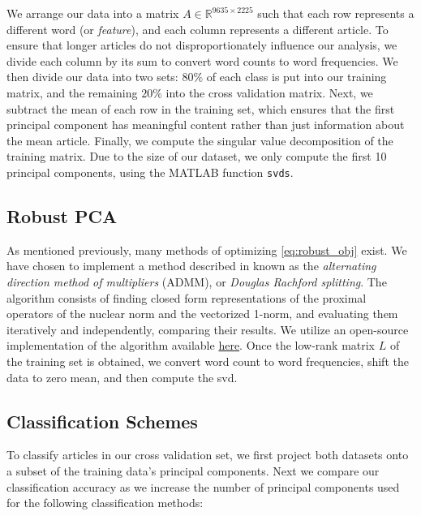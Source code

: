 \documentclass[12pt]{article}
\newcommand{\R}{\mathbb{R}}
\begin{document}
\noindent We arrange our data into a matrix $A \in \R^{9635 \times 2225}$ such that each row represents a different word (or \emph{feature}), and each column represents a different article. To ensure that longer articles do not disproportionately influence our analysis, we divide each column by its sum to convert word counts to word frequencies. We then divide our data into two sets: $80\%$ of each class is put into our training matrix, and the remaining $20\%$ into the cross validation matrix. Next, we subtract the mean of each row in the training set, which ensures that the first principal component has meaningful content rather than just information about the mean article. Finally, we compute the singular value decomposition of the training matrix. Due to the size of our dataset, we only compute the first 10 principal components, using the MATLAB function {\tt svds}. 

\subsection{Robust PCA}
As mentioned previously, many methods of optimizing \eqref{eq:robust_obj} exist. We have chosen to implement a method described in \cite{prox} known as the \emph{alternating direction method of multipliers} (ADMM), or \emph{Douglas Rachford splitting}. The algorithm consists of finding closed form representations of the proximal operators of the nuclear norm and the vectorized 1-norm, and evaluating them iteratively and independently, comparing their results.  We utilize an open-source implementation of the algorithm available {\color{blue} \href{http://stanford.edu/~boyd/admm.html}{here}}. Once the low-rank matrix $L$ of the training set is obtained, we convert word count to word frequencies, shift the data to zero mean, and then compute the svd. 

\subsection{Classification Schemes}

To classify articles in our cross validation set, we first project both datasets onto a subset of the training data's principal components. Next we compare our classification accuracy as we increase the number of principal components used for the following classification methods:
\end{document}

